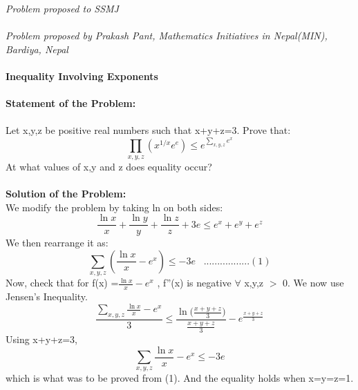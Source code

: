 \documentclass[12pt]{article}
\begin{document}
\textit{Problem proposed to SSMJ }\\ \\
\textit{Problem proposed by Prakash Pant, Mathematics Initiatives in Nepal(MIN), Bardiya, Nepal} \\ \\
\textbf{Inequality Involving Exponents} \\ \\
\textbf{Statement of the Problem:} \\ \\
Let x,y,z be positive real numbers such that x+y+z=3. Prove that:
\[ \prod_{x,y,z} (x^{1/x}e^e)  \le  e^{ \sum_{x,y,z} e^x} \]
At what values of x,y and z does equality occur? \\ \\

\textbf{Solution of the Problem:} \\
We modify the problem by taking ln on both sides:
\[ \frac{\ln{x}}{x} + \frac{\ln{y}}{y} + \frac{\ln{z}}{z} + 3e \le e^x  + e^y + e^z \]	
We then rearrange it as:
\[ \sum_{x,y,z} ( \frac{\ln{x}}{x}-e^x ) \le -3e      \,\,\,\,\, .................(1) \]
Now, check that for f(x) =$ \frac{\ln{x}}{x}-e^x $ , f''(x) is negative $ \forall $ x,y,z $>$ 0. We now use Jensen's Inequality. \\
\[ \frac{\sum_{x,y,z}{\frac{\ln{x}}{x}-e^x} }{3} \le \frac{\ln{(\frac{x+y+z}{3}})}{\frac{x+y+z}{3}} - e^{\frac{x+y+z}{3}	}\]
Using x+y+z=3,\\
\[ \sum_{x,y,z} \frac{\ln{x}}{x}-e^x  \le -3e  \]
which is what was to be proved from (1). And the equality holds when x=y=z=1.
\end{document}
